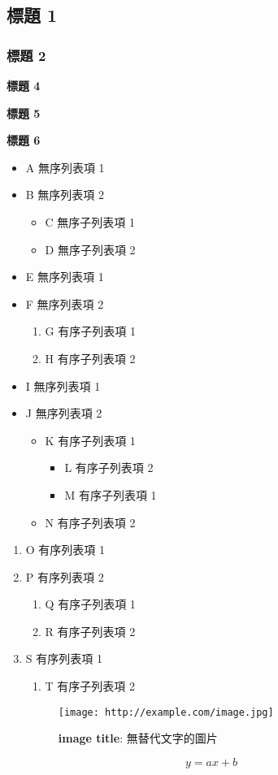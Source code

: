 \subsection{標題 1}

\subsubsection{標題 2}


\textbf{標題 4}

\textbf{標題 5}

\textbf{標題 6}


\begin{itemize}
	\item A 無序列表項 1
	\item B 無序列表項 2
	\begin{itemize}
		\item C 無序子列表項 1
		\item D 無序子列表項 2
	\end{itemize}
	\item E 無序列表項 1
	\item F 無序列表項 2
	\begin{enumerate}
		\item G 有序子列表項 1
		\item H 有序子列表項 2
	\end{enumerate}
	\item I 無序列表項 1
	\item J 無序列表項 2
	\begin{itemize}
		\item K 有序子列表項 1
		\begin{itemize}
			\item L 有序子列表項 2
			\item M 有序子列表項 1
		\end{itemize}
		\item N 有序子列表項 2
	\end{itemize}
\end{itemize}
\begin{enumerate}
	\item O 有序列表項 1
	\item P 有序列表項 2
	\begin{enumerate}
		\item Q 有序子列表項 1
		\item R 有序子列表項 2
	\end{enumerate}
	\item S 有序列表項 1
	\begin{enumerate}
		\item T 有序子列表項 2
	\end{enumerate}
\begin{figure}[htbp]
\texttt{[image: http://example.com/image.jpg]}
\caption{\textbf{image title}: 無替代文字的圖片}
\end{figure}
\end{enumerate}
\begin{equation}
y = ax+b
\end{equation}


